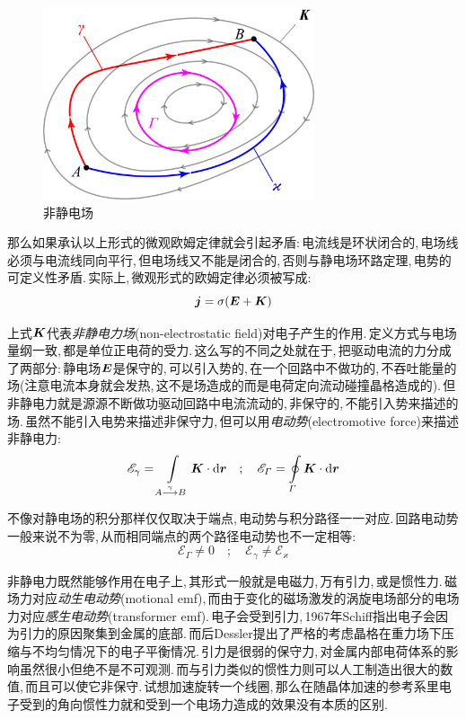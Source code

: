 \begin{figure}
\centering
\vspace{-0.3cm}
\includegraphics[width=8cm]{image/7-3-5.png}
\caption{非静电场}
\end{figure}
那么如果承认以上形式的微观欧姆定律就会引起矛盾:\,电流线是环状闭合的,\,电场线必须与电流线同向平行,\,但电场线又不能是闭合的,\,否则与静电场环路定理,\,电势的可定义性矛盾.\,实际上,\,微观形式的欧姆定律必须被写成:
\[\boldsymbol{j}=\sigma (\boldsymbol{E}+\boldsymbol{K})\]


上式$\boldsymbol{K}$代表\emph{非静电力场}(non-electrostatic field)对电子产生的作用.\,定义方式与电场量纲一致,\,都是单位正电荷的受力.\,这么写的不同之处就在于,\,把驱动电流的力分成了两部分:\,静电场$\boldsymbol{E}$是保守的,\,可以引入势的,\,在一个回路中不做功的,\,不吞吐能量的场(注意电流本身就会发热,\,这不是场造成的而是电荷定向流动碰撞晶格造成的).\,但非静电力就是源源不断做功驱动回路中电流流动的,\,非保守的,\,不能引入势来描述的场.\,虽然不能引入电势来描述非保守力,\,但可以用\emph{电动势}(electromotive force)来描述非静电力:
\[\mathscr{E}_\gamma=\int\limits_{A\stackrel{\gamma}{\longrightarrow}B} \boldsymbol{K}\cdot\textrm{d}\boldsymbol{r}\quad;\quad \mathscr{E}_\varGamma=\oint\limits_{\varGamma}\boldsymbol{K}\cdot\textrm{d}\boldsymbol{r}\]

不像对静电场的积分那样仅仅取决于端点,\,电动势与积分路径一一对应.\,回路电动势一般来说不为零,\,从而相同端点的两个路径电动势也不一定相等:
\[\mathscr{E}_\varGamma\neq 0\quad;\quad \mathscr{E}_\gamma\neq\mathscr{E}_\varkappa\]

非静电力既然能够作用在电子上,\,其形式一般就是电磁力,\,万有引力,\,或是惯性力.\,磁场力对应\emph{动生电动势}(motional emf),\,而由于变化的磁场激发的涡旋电场部分的电场力对应\emph{感生电动势}(transformer emf).\,电子会受到引力,\,1967年Schiff指出电子会因为引力的原因聚集到金属的底部.\,而后Dessler提出了严格的考虑晶格在重力场下压缩与不均匀情况下的电子平衡情况.\,引力是很弱的保守力,\,对金属内部电荷体系的影响虽然很小但绝不是不可观测.\,而与引力类似的惯性力则可以人工制造出很大的数值,\,而且可以使它非保守.\,试想加速旋转一个线圈,\,那么在随晶体加速的参考系里电子受到的角向惯性力就和受到一个电场力造成的效果没有本质的区别.

